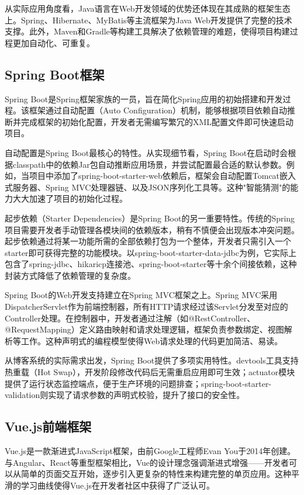 \documentclass[UTF8,AutoFakeBold=1,AutoFakeSlant,zihao=-4]{SCAU}
\begin{document}
 从实际应用角度看，Java语言在Web开发领域的优势还体现在其成熟的框架生态上。Spring、Hibernate、MyBatis等主流框架为Java Web开发提供了完整的技术支撑。此外，Maven和Gradle等构建工具解决了依赖管理的难题，使得项目构建过程更加自动化、可重复。

 \subsection{Spring Boot框架}

 Spring Boot是Spring框架家族的一员，旨在简化Spring应用的初始搭建和开发过程。该框架通过自动配置（Auto Configuration）机制，能够根据项目依赖自动推断并完成框架的初始化配置，开发者无需编写繁冗的XML配置文件即可快速启动项目{\citep{罗涛2020}}。

 自动配置是Spring Boot最核心的特性。从实现细节看，Spring Boot在启动时会根据classpath中的依赖Jar包自动推断应用场景，并尝试配置最合适的默认参数。例如，当项目中添加了spring-boot-starter-web依赖后，框架会自动配置Tomcat嵌入式服务器、Spring MVC处理器链、以及JSON序列化工具等。这种"智能猜测"的能力大大加速了项目的初始化过程。

 起步依赖（Starter Dependencies）是Spring Boot的另一重要特性。传统的Spring项目需要开发者手动管理各模块间的依赖版本，稍有不慎便会出现版本冲突问题。起步依赖通过将某一功能所需的全部依赖打包为一个整体，开发者只需引入一个starter即可获得完整的功能模块。以spring-boot-starter-data-jdbc为例，它实际上包含了spring-jdbc、hikaricp连接池、spring-boot-starter等十余个间接依赖，这种封装方式降低了依赖管理的复杂度。

 Spring Boot的Web开发支持建立在Spring MVC框架之上。Spring MVC采用DispatcherServlet作为前端控制器，所有HTTP请求经过该Servlet分发至对应的Controller处理。在控制器中，开发者通过注解（如@RestController、@RequestMapping）定义路由映射和请求处理逻辑，框架负责参数绑定、视图解析等工作。这种声明式的编程模型使得Web请求处理的代码更加简洁、易读。

 从博客系统的实际需求出发，Spring Boot提供了多项实用特性。devtools工具支持热重载（Hot Swap），开发阶段修改代码后无需重启应用即可生效；actuator模块提供了运行状态监控端点，便于生产环境的问题排查；spring-boot-starter-validation则实现了请求参数的声明式校验，提升了接口的安全性。

 \subsection{Vue.js前端框架}

 Vue.js是一款渐进式JavaScript框架，由前Google工程师Evan You于2014年创建。与Angular、React等重型框架相比，Vue的设计理念强调渐进式增强——开发者可以从简单的页面交互开始，逐步引入更复杂的特性来构建完整的单页应用{\citep{曾广海2016}}。这种平滑的学习曲线使得Vue.js在开发者社区中获得了广泛认可。
\end{document}
